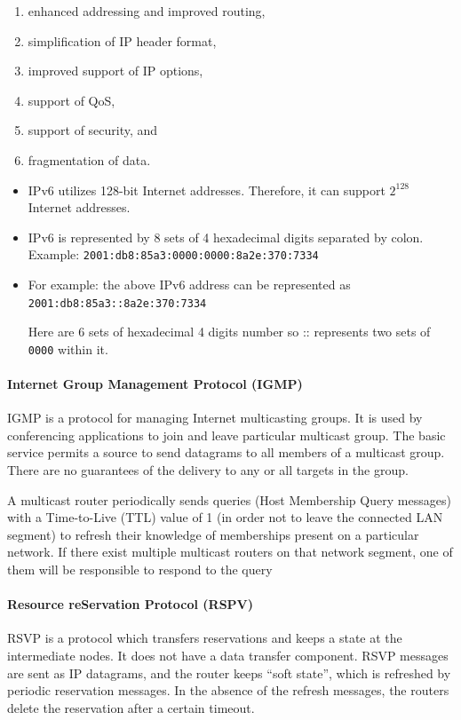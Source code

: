 		\begin{enumerate}
		\item enhanced addressing and improved routing, 
		\item simplification of IP header format, 
		\item improved support of IP options, 
		\item support of QoS, 
		\item support of security, and 
		\item fragmentation of data.
	\end{enumerate}


\begin{framed}
	\begin{itemize}
		\item IPv6 utilizes 128-bit Internet addresses. Therefore, it can support $ 2^{128} $ Internet addresses.
		
		\item IPv6 is represented by 8 sets of 4 hexadecimal digits separated by colon.
		Example: \texttt{2001:db8:85a3:0000:0000:8a2e:370:7334}
		
		
		\item For example: the above IPv6 address can be represented as
		\texttt{2001:db8:85a3::8a2e:370:7334}
		
		Here are 6 sets of hexadecimal 4 digits number so :: represents two sets of \texttt{0000} within it.
	\end{itemize}
\end{framed}


\paragraph[IGMP]{Internet Group Management Protocol (IGMP)}
IGMP is a protocol for managing Internet multicasting groups. It is used by conferencing applications to join and leave particular multicast group. The basic service permits a source to send datagrams to all members of a multicast group. There are no guarantees of the delivery to any or all targets in the group.

A multicast router periodically sends queries (Host Membership Query messages) with a Time-to-Live (TTL) value of 1 (in order not to leave the connected LAN segment) to refresh their knowledge of memberships present on a particular network. If there exist multiple multicast routers on that network segment, one of them will be
responsible to respond to the query

\paragraph[RSPV]{Resource reServation Protocol (RSPV)}
RSVP is a protocol which transfers reservations and keeps a state at the intermediate nodes. It does not have a data transfer component. RSVP messages are sent as IP datagrams, and the router keeps ``soft state'', which is refreshed by periodic reservation messages. In the absence of the refresh messages, the routers delete the reservation after a certain timeout.

